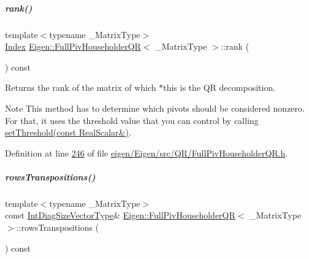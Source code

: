 \mbox{\label{group___q_r___module_aeae555220f46477818ccc94aca2de770}} 
\subparagraph{\texorpdfstring{rank()}{rank()}\hspace{0.1cm}{\footnotesize\ttfamily [2/2]}}
{\footnotesize\ttfamily template$<$typename \+\_\+\+Matrix\+Type$>$ \\
\hyperlink{namespace_eigen_a62e77e0933482dafde8fe197d9a2cfde}{Index} \hyperlink{group___q_r___module_class_eigen_1_1_full_piv_householder_q_r}{Eigen\+::\+Full\+Piv\+Householder\+QR}$<$ \+\_\+\+Matrix\+Type $>$\+::rank (\begin{DoxyParamCaption}{ }\end{DoxyParamCaption}) const\hspace{0.3cm}{\ttfamily [inline]}}

\begin{DoxyReturn}{Returns}
the rank of the matrix of which $\ast$this is the QR decomposition.
\end{DoxyReturn}
\begin{DoxyNote}{Note}
This method has to determine which pivots should be considered nonzero. For that, it uses the threshold value that you can control by calling \hyperlink{group___q_r___module_a92277e572bf98245891015d12dd2b602}{set\+Threshold(const Real\+Scalar\&)}. 
\end{DoxyNote}


Definition at line \hyperlink{eigen_2_eigen_2src_2_q_r_2_full_piv_householder_q_r_8h_source_l00246}{246} of file \hyperlink{eigen_2_eigen_2src_2_q_r_2_full_piv_householder_q_r_8h_source}{eigen/\+Eigen/src/\+Q\+R/\+Full\+Piv\+Householder\+Q\+R.\+h}.

\mbox{\label{group___q_r___module_abebbfc0ca6e3dd285a0ad0c907abb093}} 
\subparagraph{\texorpdfstring{rows\+Transpositions()}{rowsTranspositions()}\hspace{0.1cm}{\footnotesize\ttfamily [1/2]}}
{\footnotesize\ttfamily template$<$typename \+\_\+\+Matrix\+Type$>$ \\
const \hyperlink{group___core___module}{Int\+Diag\+Size\+Vector\+Type}\& \hyperlink{group___q_r___module_class_eigen_1_1_full_piv_householder_q_r}{Eigen\+::\+Full\+Piv\+Householder\+QR}$<$ \+\_\+\+Matrix\+Type $>$\+::rows\+Transpositions (\begin{DoxyParamCaption}{ }\end{DoxyParamCaption}) const\hspace{0.3cm}{\ttfamily [inline]}}

